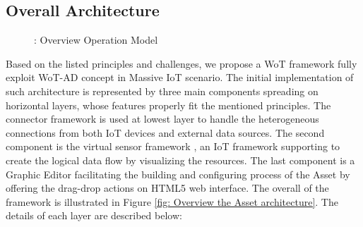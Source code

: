 \subsection{Overall Architecture}
\begin{figure}[h]
	\centering
	\caption{ : Overview Operation Model}
	\label{fig: Overview Operation Model}
\end{figure}
Based on the listed principles and challenges, we propose a WoT framework fully exploit WoT-AD concept in Massive IoT scenario. The initial implementation of such architecture is represented by three main components spreading on horizontal layers, whose features properly fit the mentioned principles. The connector framework is used at lowest layer \cite{kim2017industrial} to handle the heterogeneous connections from both IoT devices and external data sources. The second component is the virtual sensor framework \cite{kim2017scalable}, an IoT framework supporting to create the logical data flow by visualizing the resources. The last component is a Graphic Editor facilitating the building and configuring process of the Asset by offering the drag-drop actions on HTML5 web interface. The overall of the framework is illustrated in Figure \ref{fig: Overview the Asset architecture}. The details of each layer are described below:
